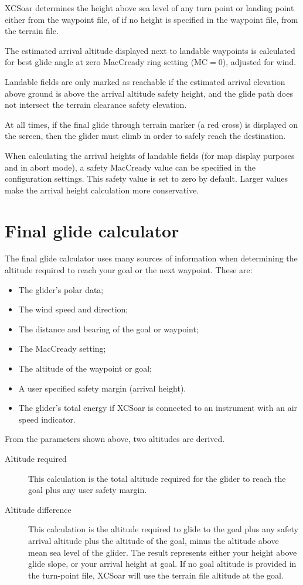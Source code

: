 \documentclass[a4paper,12pt]{refrep}
\begin{document}
XCSoar determines the height above sea level of any turn point or
landing point either from the waypoint file, of if no height is
specified in the waypoint file, from the terrain file.

The estimated arrival altitude displayed next to landable waypoints is
calculated for best glide angle at zero MacCready ring setting
(MC$=0$), adjusted for wind.

Landable fields are only marked as reachable if the estimated arrival
elevation above ground is above the arrival altitude safety height,
and the glide path does not intersect the terrain clearance safety
elevation.

At all times, if the final glide through terrain marker (a red
cross) is displayed on the screen, then the glider must climb in order
to safely reach the destination.

When calculating the arrival heights of landable fields (for map
display purposes and in abort mode), a safety MacCready value can be
specified in the configuration settings.  This safety value is set to
zero by default.  Larger values make the arrival height calculation
more conservative.

\section{Final glide calculator}

The final glide calculator uses many sources of information when
determining the altitude required to reach your goal or the next
waypoint. These are:

\begin{itemize}
\item The glider's polar data;
\item The wind speed and direction;
\item The distance and bearing of the goal or waypoint;
\item The MacCready setting;
\item The altitude of the waypoint or goal;
\item A user specified safety margin (arrival height).
\item The glider's total energy if XCSoar is connected to
  an instrument with an air speed indicator.
\end{itemize}

From the parameters shown above, two altitudes are derived.
\begin{description}
\item[Altitude required]
This calculation is the total altitude required for the glider to
reach the goal plus any user safety margin. 
\item[Altitude difference]
This calculation is the altitude required to glide to the goal plus
any safety arrival altitude plus the altitude of the goal, minus the
altitude above mean sea level of the glider.  The result represents
either your height above glide slope, or your arrival height at goal.
If no goal altitude is provided in the turn-point file, XCSoar will use
the terrain file altitude at the goal.
\end{description}
\end{document}
